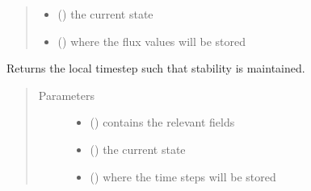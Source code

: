 \documentclass[letterpaper,10pt,english]{sphinxmanual}
\begin{document}
\begin{fulllineitems}
\begin{fulllineitems}
\begin{quote}
\begin{description}
\begin{itemize}
\item {} 
\sphinxAtStartPar
{} ({\hyperref[\detokenize{autoapi/Field/index:Field.Field}]{}}) \textendash{} the current state

\item {} 
\sphinxAtStartPar
{} ({\hyperref[\detokenize{autoapi/Field/index:Field.Field}]{}}) \textendash{} where the flux values will be stored

\end{itemize}

\end{description}\end{quote}

\end{fulllineitems}


\begin{fulllineitems}
\label{\detokenize{autoapi/NavierStokes/index:NavierStokes.NavierStokes.get_safe_timestep}}
\sphinxAtStartPar
Returns the local timestep such that stability is maintained.
\begin{quote}\begin{description}
\item[{Parameters}] \leavevmode\begin{itemize}
\item {} 
\sphinxAtStartPar
{} ({\hyperref[\detokenize{autoapi/Workspace/index:Workspace.Workspace}]{}}) \textendash{} contains the relevant fields

\item {} 
\sphinxAtStartPar
{} ({\hyperref[\detokenize{autoapi/Field/index:Field.Field}]{}}) \textendash{} the current state

\item {} 
\sphinxAtStartPar
{} ({\hyperref[\detokenize{autoapi/Field/index:Field.Field}]{}}) \textendash{} where the time steps will be stored


\end{itemize}
\end{description}
\end{quote}
\end{fulllineitems}
\end{fulllineitems}
\end{document}
